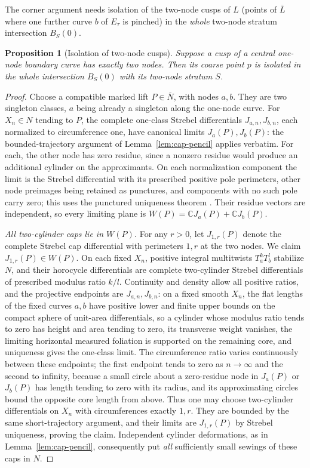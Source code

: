 \documentclass[11pt]{article}
\newcommand{\cl}[1]{\overline{#1}}
\newtheorem{proposition}[theorem]{Proposition}
\theoremstyle{remark}
\begin{document}
The corner argument needs isolation of the two-node cusps of \(L\)
(points of \(\cl L\) where one further curve \(b\) of \(E_\tau\) is
pinched) in the \emph{whole} two-node stratum intersection \(B_S(0)\).

\begin{proposition}[Isolation of two-node cusps]\label{prop:two-corner}
Suppose a cusp of a central one-node boundary curve has exactly
two nodes. Then its coarse point \(p\) is isolated in the
whole intersection \(B_S(0)\) with its two-node stratum \(S\).
\end{proposition}
\begin{proof}
Choose a compatible marked lift \(P\in\cl N\), with nodes
\(a,b\). They are two singleton classes, \(a\) being already a
singleton along the one-node curve. For \(X_n\in N\) tending
to \(P\), the complete one-class Strebel differentials
\(J_{a,n},J_{b,n}\), each normalized to circumference one,
have canonical limits \(J_a(P),J_b(P)\): the bounded-trajectory
argument of Lemma~\ref{lem:cap-pencil} applies verbatim. For each,
the other node has zero residue, since a nonzero residue would produce
an additional cylinder on the approximants. On each
normalization component the limit is the Strebel differential
with its prescribed positive pole perimeters, other node
preimages being retained as punctures, and components with no such
pole carry zero; this uses the punctured uniqueness theorem
\cite[Theorem 2, Remark 3.8]{Zvonkine}.
Their residue vectors are independent, so every limiting
plane is \(W(P)=\mathbb C J_a(P)+\mathbb C J_b(P)\).

\emph{All two-cylinder caps lie in \(W(P)\).}
For any \(r>0\), let \(J_{1,r}(P)\) denote the complete
Strebel cap differential with perimeters \(1,r\) at the two
nodes. We claim \(J_{1,r}(P)\in W(P)\).
On each fixed \(X_n\), positive integral multitwists
\(T_a^kT_b^l\) stabilize \(N\), and their horocycle differentials
\cite[Lemmas 2.4--2.5]{AHW} are complete two-cylinder
Strebel differentials of prescribed modulus ratio \(k/l\).
Continuity and density allow all positive ratios, and the
projective endpoints are \(J_{a,n},J_{b,n}\): on a fixed
smooth \(X_n\), the flat lengths of the fixed curves \(a,b\) have
positive lower and finite upper bounds on the compact sphere of
unit-area differentials, so a cylinder whose modulus ratio tends
to zero has height and area tending to zero, its transverse weight
vanishes, the limiting horizontal measured foliation is
supported on the remaining core, and uniqueness gives the
one-class limit.
The circumference ratio varies continuously between these
endpoints; the first endpoint tends to zero as \(n\to\infty\)
and the second to infinity, because a small
circle about a zero-residue node in \(J_a(P)\) or \(J_b(P)\)
has length tending to zero with its radius, and its approximating
circles bound the opposite core length from above.
Thus one may choose two-cylinder differentials on \(X_n\)
with circumferences exactly \(1,r\). They are bounded by the same
short-trajectory argument, and their limits are \(J_{1,r}(P)\) by
Strebel uniqueness, proving the claim. Independent cylinder
deformations, as in Lemma~\ref{lem:cap-pencil}, consequently put
\emph{all} sufficiently small sewings of these caps in \(N\).


\end{proof}
\end{document}
